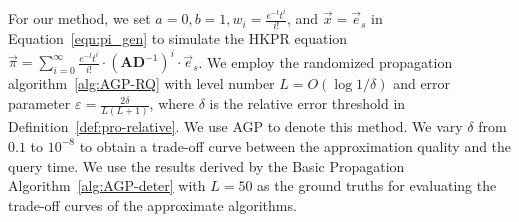For our method, we set $a=0,b=1, w_i=\frac{e^{-t}t^i}{i!}$, and $\vec{x}=\vec{e}_s$ in Equation~\eqref{eqn:pi_gen} to simulate the HKPR equation $\vec{\pi}=\sum_{i=0}^\infty \frac{e^{-t}t^i}{i!}\cdot \left(\mathbf{A}\mathbf{D}^{-1}\right)^i\cdot \vec{e}_s$. We employ the randomized propagation algorithm~\ref{alg:AGP-RQ} with level number $L= O\left(\log {1/\delta}\right)$ and error parameter $\varepsilon = \frac{2\delta}{L(L+1)}$, where $\delta$ is the relative error threshold in Definition~\ref{def:pro-relative}. We use AGP to denote this method. We vary $\delta$ from $0.1$ to $10^{-8}$ to obtain a trade-off curve between the approximation quality and the query time. 
We use the results derived by the Basic Propagation Algorithm~\ref{alg:AGP-deter} with $L = 50$ as the ground truths for evaluating the trade-off curves of the approximate algorithms.

